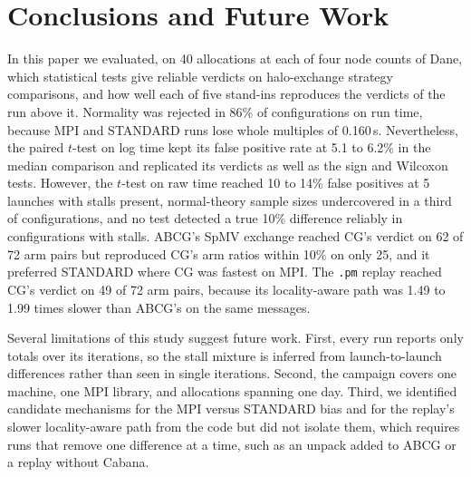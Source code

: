 \documentclass[11pt]{article}
\newcommand{\pmrep}{\texttt{.pm} replay}
\begin{document}
\section{Conclusions and Future Work}
\label{sec:conclusion}

In this paper we evaluated, on 40 allocations at each of four node counts of Dane, which
statistical tests give reliable verdicts on halo-exchange strategy comparisons, and how
well each of five stand-ins reproduces the verdicts of the run above it. Normality was
rejected in 86\% of configurations on run time, because MPI and STANDARD runs lose whole
multiples of 0.160\,s. Nevertheless, the paired $t$-test on log time kept its false
positive rate at 5.1 to 6.2\% in the median comparison and replicated its verdicts as well
as the sign and Wilcoxon tests. However, the $t$-test on raw time reached 10 to 14\%
false positives at 5 launches with stalls present, normal-theory sample sizes undercovered
in a third of configurations, and no test detected a true 10\% difference reliably in
configurations with stalls. ABCG's SpMV exchange reached CG's verdict on 62 of 72 arm pairs
but reproduced CG's arm ratios within 10\% on only 25, and it preferred STANDARD where CG
was fastest on MPI. The \pmrep{} reached CG's verdict on 49 of 72 arm pairs, because its
locality-aware path was 1.49 to 1.99 times slower than ABCG's on the same messages.

Several limitations of this study suggest future work. First, every run reports only
totals over its iterations, so the stall mixture is inferred from launch-to-launch
differences rather than seen in single iterations. Second, the campaign covers one machine,
one MPI library, and allocations spanning one day. Third, we identified candidate
mechanisms for the MPI versus STANDARD bias and for the replay's slower locality-aware path
from the code but did not isolate them, which requires runs that remove one difference at
a time, such as an unpack added to ABCG or a replay without Cabana.



\end{document}
